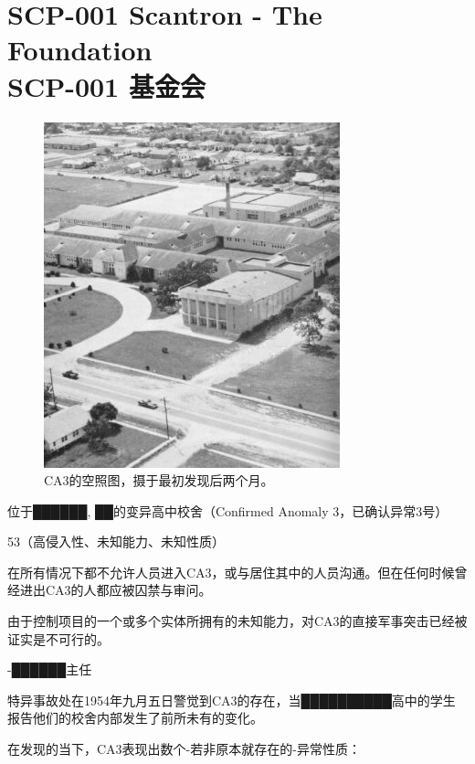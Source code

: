\chapter[SCP-001 基金会]{
	SCP-001 Scantron - The Foundation \\
	SCP-001 基金会
}

\label{chap:SCP-001.the.foundation}

\begin{figure}[H]
	\centering
	\includegraphics[width=0.5\linewidth]{images/SCP.001.9.jpg}
	\caption*{CA3的空照图，摄于最初发现后两个月。}
\end{figure}

 位于██████, ██的变异高中校舍（Confirmed Anomaly 3，已确认异常3号）

53（高侵入性、未知能力、未知性质）


在所有情况下都不允许人员进入CA3，或与居住其中的人员沟通。但在任何时候曾经进出CA3的人都应被囚禁与审问。

由于控制项目的一个或多个实体所拥有的未知能力，对CA3的直接军事突击已经被证实是不可行的。

 -██████主任

特异事故处在1954年九月五日警觉到CA3的存在，当██████████高中的学生报告他们的校舍内部发生了前所未有的变化。

在发现的当下，CA3表现出数个-若非原本就存在的-异常性质：

